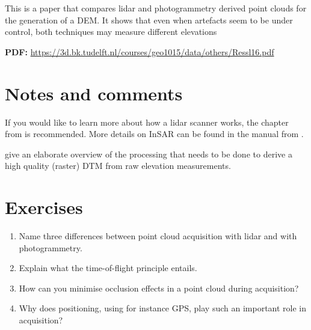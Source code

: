 \begin{kaobox-toread}[frametitle=\faExternalLink\ To read or to watch]
This is a paper that compares lidar and photogrammetry derived point clouds for the generation of a DEM\@. It shows that even when artefacts seem to be under control, both techniques may measure different elevations 

\textbf{PDF:} \url{https://3d.bk.tudelft.nl/courses/geo1015/data/others/Ressl16.pdf}
\end{kaobox-toread}







%
\section{Notes and comments}
If you would like to learn more about how a lidar scanner works, the chapter from \citet{Chazette16} is recommended.
More details on InSAR can be found in the manual from \citet{ESA07}.

\citet{Reuter09} give an elaborate overview of the processing that needs to be done to derive a high quality (raster) DTM from raw elevation measurements.


%
\section{Exercises}

\begin{enumerate}
	\item Name three differences between point cloud acquisition with lidar and with photogrammetry.
	\item Explain what the time-of-flight principle entails.
	\item How can you minimise occlusion effects in a point cloud during acquisition?
	\item Why does positioning, using for instance GPS, play such an important role in acquisition?
\end{enumerate}
